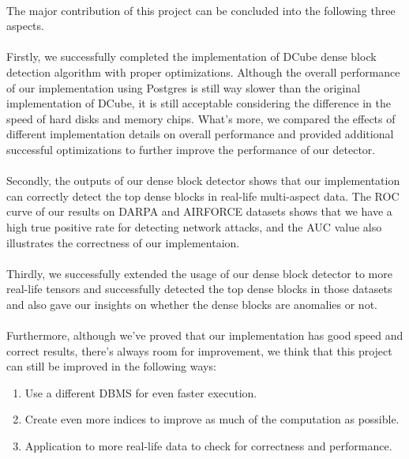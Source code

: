\paragraph{} The major contribution of this project can be concluded into the following three aspects. 
\paragraph{} Firstly, we successfully completed the implementation of DCube dense block detection algorithm with proper optimizations. Although the overall performance of our implementation
using Postgres is still way slower than the original implementation of DCube, it is still acceptable considering the difference in the speed of hard disks and memory chips. What's more,
we compared the effects of different implementation details on overall performance and provided additional successful optimizations to further improve the performance of our detector.
\paragraph{} Secondly, the outputs of our dense block detector shows that our implementation can correctly detect the top dense blocks in real-life multi-aspect data. The ROC curve of
our results on DARPA and AIRFORCE datasets shows that we have a high true positive rate for detecting network attacks, and the AUC value also illustrates the correctness of our implementaion.
\paragraph{} Thirdly, we successfully extended the usage of our dense block detector to more real-life tensors and successfully detected the top dense blocks in those datasets and also gave our
insights on whether the dense blocks are anomalies or not.
\paragraph{} Furthermore, although we've proved that our implementation has good speed and correct results, there's always room for improvement, we think that this project can still be
improved in the following ways:
\begin{enumerate}
\item Use a different DBMS for even faster execution.
\item Create even more indices to improve as much of the computation as possible.
\item Application to more real-life data to check for correctness and performance.
\end{enumerate}